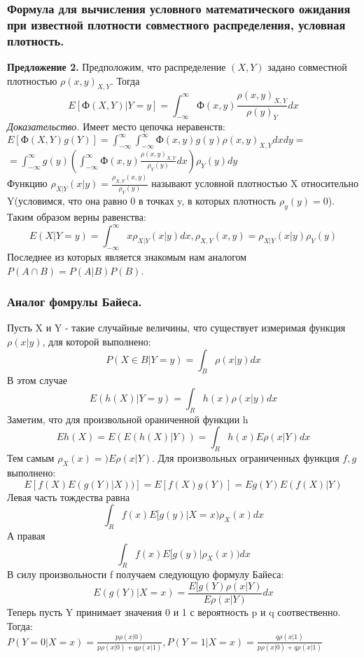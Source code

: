 \subsubsection{Формула для вычисления условного математического ожидания при известной плотности совместного распределения, условная плотность.}
\textbf{Предложение 2.} Предположим, что распределение $(X, Y)$ задано совместной плотностью $\rho(x,y)_{X, Y}$. Тогда\\
$$E[Ф(X, Y)|Y = y] = \int_{-\infty}^{\infty}Ф(x, y)\frac{\rho(x,y)_{X, Y}}{\rho(y)_{Y}}dx$$
\textit{Доказательство.} Имеет место цепочка неравенств:\\
$E[Ф(X, Y)g(Y)] = \int_{-\infty}^{\infty} \int_{-\infty}^{\infty}Ф(x, y)g(y)\rho(x,y)_{X, Y}dxdy =$\\
$= \int_{-\infty}^{\infty} g(y) (\int_{-\infty}^{\infty}Ф(x, y)\frac{\rho(x,y)_{X, Y}}{\rho_Y(y)}dx)\rho_Y(y)dy$\\
Функцию $\rho_{X|Y}(x|y) = \frac{\rho_{X, Y}(x, y)}{\rho_Y(y)}$ называют условной плотностью X относительно Y(условимся, что она равно 0 в точках y, в которых плотность $\rho_y(y) = 0$). Таким образом верны равенства:\\
$$E(X|Y = y) = \int_{-\infty}^{\infty} x\rho_{X|Y}(x|y)dx, \rho_{X,Y}(x,y) = \rho_{X|Y}(x|y)\rho_Y(y)$$
Последнее из которых является знакомым нам аналогом $P(A\cap B) = P(A|B)P(B)$.

\subsubsection{Аналог фомрулы Байеса.}
Пусть X и Y - такие случайные величины, что существует измеримая функция $\rho(x|y)$, для которой выполнено:\\
$$P(X \in B| Y = y) = \int_B \rho(x|y)dx$$
В этом случае
$$E(h(X)| Y = y) = \int_R h(x)\rho(x|y)dx$$
Заметим, что для произвольной ораниченной функции h
$$Eh(X) = E(E(h(X)|Y))=\int_Rh(x)E\rho(x|Y) dx$$
Тем самым $\rho_X(x) = )E\rho(x|Y)$. Для произвольных ограниченных функция $f, g$ выполнено:\\
$$E[f(X)E(g(Y)|X))]=E[f(X)g(Y)]=Eg(Y)E(f(X)|Y)$$
Левая часть тождества равна
$$\int_R f(x)E[g(y)|X = x)\rho_X(x)dx$$
А правая
$$\int_R f(x)E[g(y)|\rho_X(x))dx$$
В силу произвольности f получаем следующую формулу Байеса:\\
$$E(g(Y)|X = x) = \frac{E[g(Y)\rho(x|Y)}{E\rho(x|Y)}dx$$
Теперь пусть Y принимает значения 0 и 1 с вероятность p и q соотвественно. Тогда:\\
$P(Y = 0|X = x) = \frac{p\rho(x|0)}{p\rho(x|0) + q\rho(x|1)}, P(Y = 1|X = x) = \frac{q\rho(x|1)}{p\rho(x|0) + q\rho(x|1)}$
